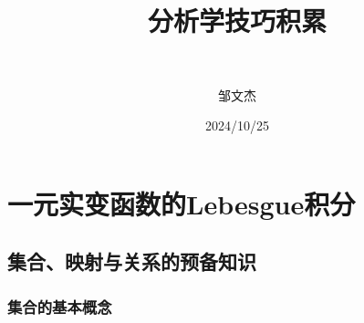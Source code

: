 \documentclass[lang=cn,newtx,10pt,scheme=chinese]{elegantbook}
\title{分析学技巧积累}
\subtitle{\,\,}
\author{邹文杰}
\institute{无}
\date{2024/10/25}
\begin{document}
\maketitle
\frontmatter

\tableofcontents

\mainmatter
\everymath{\displaystyle} %


\part{一元实变函数的Lebesgue积分}

\chapter{集合、映射与关系的预备知识}

\section{集合的基本概念}
\end{document}
